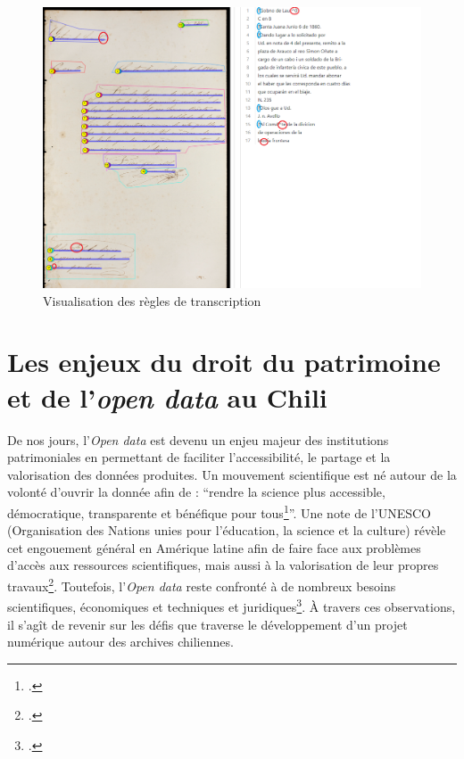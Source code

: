 	 \begin{figure}[h!]
	     \centering
	     \includegraphics[width = 1.1\textwidth]{annexes/img/trans_rules.png}
	     \caption{Visualisation des règles de transcription}
	     \label{fig:transcription}
	 \end{figure}
	
	\section{Les enjeux du droit du patrimoine et de l'\textit{open data} au Chili}
	
	De nos jours, l'\textit{Open data} est devenu un enjeu majeur des institutions patrimoniales en permettant de faciliter l'accessibilité, le partage et la valorisation des données produites. Un mouvement scientifique est né autour de la volonté d'ouvrir la donnée afin de : \enquote{rendre la science plus accessible, démocratique, transparente et bénéfique pour tous\footcite{OpenScienceLatin2020}}. Une note de l'UNESCO (Organisation des Nations unies pour l'éducation, la science et la culture) révèle cet engouement général en Amérique latine afin de faire face aux problèmes d'accès aux ressources scientifiques, mais aussi à la valorisation de leur propres travaux\footcite{OpenScienceLatin2020}. 
	Toutefois, l'\textit{Open data} reste confronté à de nombreux besoins scientifiques, économiques et techniques et juridiques\footcite{jacqueminLibreAccesDonnees2019}. À travers ces observations, il s'agît de revenir sur les défis que traverse le développement d'un projet numérique autour des archives chiliennes.
	
